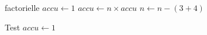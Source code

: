 \begin{algo}{factorielle}
\Constant{$\emptyset$}
\Global{$\emptyset$}
\Local{$\emptyset$}
\BlankLine
  $accu \leftarrow 1$ \;
   {
    $accu \leftarrow n \times accu$ \;
    $n \leftarrow n - (3 + 4)$ 
  }
\end{algo}

\begin{algo}{Test}
\Global{$\emptyset$}
\Local{$\emptyset$}
\BlankLine
  $accu \leftarrow 1$ \;

\end{algo}


